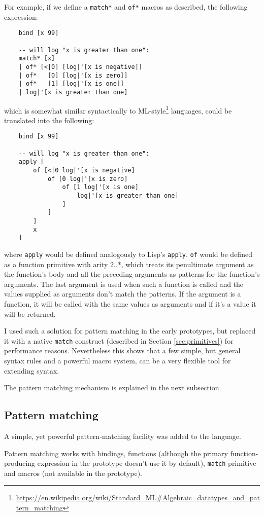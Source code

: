 For example, if we define a \texttt{match*} and \texttt{of*} macros as described, the following expression:
\begin{lstlisting}
    bind [x 99]
    
    -- will log "x is greater than one":
    match* [x]
    | of* [<|0] [log|'[x is negative]]
    | of*   [0] [log|'[x is zero]]
    | of*   [1] [log|'[x is one]]
    | log|'[x is greater than one]
\end{lstlisting}

which is somewhat similar syntactically to ML-style\footnote{\url{https://en.wikipedia.org/wiki/Standard_ML\#Algebraic_datatypes_and_pattern_matching}} languages, could be translated into the following:
\begin{lstlisting}
    bind [x 99]
    
    -- will log "x is greater than one":
    apply [
        of [<|0 log|'[x is negative] 
            of [0 log|'[x is zero]
                of [1 log|'[x is one]
                    log|'[x is greater than one]
                ]
            ]
        ]
        x
    ]
\end{lstlisting}

where \texttt{apply} would be defined analogously to Lisp's \texttt{apply}. \texttt{of} would be defined as a function primitive with arity 2..*, which treats its penultimate argument as the function's body and all the preceding arguments as patterns for the function's arguments. The last argument is used when such a function is called and the values supplied as arguments don't match the patterns. If the argument is a function, it will be called with the same values as arguments and if it's a value it will be returned.

I used such a solution for pattern matching in the early prototypes, but replaced it with a native \texttt{match} construct (described in Section \ref{sec:primitives}) for performance reasons. Nevertheless this shows that a few simple, but general syntax rules and a powerful macro system, can be a very flexible tool for extending syntax.

The pattern matching mechanism is explained in the next subsection.

\subsection{Pattern matching}
A simple, yet powerful pattern-matching facility was added to the language.

Pattern matching works with bindings, functions (although the primary function-producing expression in the prototype doesn't use it by default), \texttt{match} primitive and macros (not available in the prototype).

